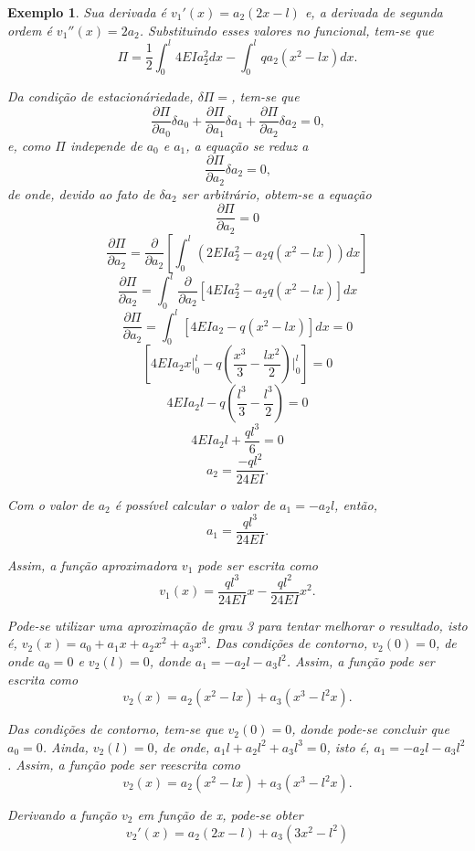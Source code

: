 \documentclass[
	12pt,				%
	openright,			%
    twoside,			%
	a4paper,			%
	english,			%
	french,				%
	spanish,			%
	brazil				%
	]{abntex2}
\theoremstyle{plain}
\newtheorem{example}{Exemplo}
\begin{document}
\begin{example}
	Sua derivada é $v_1'(x)=a_2(2x-l)$ e, a derivada de segunda ordem é $v_1''(x)=2a_2$. Substituindo esses valores no funcional, tem-se que
	$$
		\Pi =
		\frac{1}{2}
		\int_0^l 4 EI a_2 ^2 dx
		-
		\int_0^l q a_2 (x^2-lx) dx
		\text{.}
	$$
	
	Da condição de estacionáriedade, $\delta \Pi=$, tem-se que
	$$
		\frac{\partial \Pi}{\partial a_0} \delta a_0
		+
		\frac{\partial \Pi}{\partial a_1} \delta a_1
		+
		\frac{\partial \Pi}{\partial a_2} \delta a_2
		= 0 \text{,}
	$$
	e, como $\Pi$ independe de $a_0$ e $a_1$, a equação se reduz a
	$$
		\frac{\partial \Pi}{\partial a_2} \delta a_2 
		= 0
		\text{,}
	$$
	de onde, devido ao fato de $\delta a_2$ ser arbitrário, obtem-se a equação
	$$
		\frac{\partial \Pi}{\partial a_2} = 0
	$$
	$$
		\frac{\partial \Pi}{\partial a_2}
		=
		\frac{\partial}{\partial a_2} \left [
			\int_0^l \left ( 2EIa_2 ^2 - a_2 q (x^2 -lx) \right ) dx
		\right]
	$$
	$$
		\frac{\partial \Pi}{\partial a_2}
		=
		\int_0^l
			\frac{\partial}{\partial a_2} \left [
			4EIa_2^2 - a_2 q(x^2-lx)
		\right ] dx
	$$
	$$
		\frac{\partial \Pi}{\partial a_2}
		=
		\int_0^l \left [
			4EIa_2 - q(x^2-lx)
		\right ] dx = 0
	$$
	$$
		\left [ 
			4EIa_2 x \Big |_0^l
			-
			q \left (
				\frac{x^3}{3} - \frac{lx^2}{2}
			\right ) \Big |_0^l
		\right ] 
		= 0
	$$
	$$
		4EIa_2l
		-
		q \left (\frac{l^3}{3} - \frac{l^3}{2} \right )
		= 0
	$$	
	$$
		4EIa_2l+\frac{ql^3}{6} = 0
	$$
	$$
		a_2=\frac{-ql^2}{24EI}\text{.}
	$$

	Com o valor de $a_2$ é possível calcular o valor de $a_1=-a_2l$, então, 
	$$a_1=\frac{ql^3}{24EI}\text{.}$$
	
	Assim, a função aproximadora $v_1$ pode ser escrita como
	$$
		v_1(x)=
		\frac{ql^3}{24EI}x
		-
		\frac{ql^2}{24EI}x^2
		\text{.}
	$$
	
	Pode-se utilizar uma aproximação de grau 3 para tentar melhorar o resultado, isto é, $v_2(x)=a_0+a_1x+a_2x^2+a_3x^3$. Das condições de contorno, $v_2(0)=0$, de onde $a_0=0$ e $v_2(l)=0$, donde $a_1=-a_2 l - a_3 l^2$. Assim, a função pode ser escrita como
	$$
		v_2(x)=
		a_2(x^2-lx)
		+
		a_3(x^3-l^2x)
		\text{.}
	$$
	
	Das condições de contorno, tem-se que $v_2(0)=0$, donde pode-se concluir que $a_0=0$. Ainda, $v_2(l)=0$, de onde, $a_1 l + a_2 l^2 + a_3 l^3=0$, isto é, $a_1=-a_2 l - a_3 l^2$. Assim, a função pode ser reescrita como
	$$
		v_2(x)=
		a_2(x^2-lx)
		+
		a_3(x^3-l^2x)
		\text{.}
	$$
	
	Derivando a função $v_2$ em função de x, pode-se obter
	$$
	v_2'(x)=
	a_2(2x-l)
	+
	a_3(3x^2-l^2)
	$$


\end{example}
\end{document}
